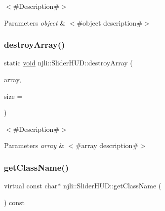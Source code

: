 $<$\#\+Description\#$>$


\begin{DoxyParams}{Parameters}
{\em object} & $<$\#object description\#$>$ \\
\hline
\end{DoxyParams}
\mbox{\label{classnjli_1_1_slider_h_u_d_ad2a2ea86c9748a6dbbaa9fb32860be0a}} 
\subsubsection{\texorpdfstring{destroy\+Array()}{destroyArray()}}
{\footnotesize\ttfamily static \mbox{\hyperlink{_thread_8h_af1e856da2e658414cb2456cb6f7ebc66}{void}} njli\+::\+Slider\+H\+U\+D\+::destroy\+Array (\begin{DoxyParamCaption}\item[{\mbox{\hyperlink{classnjli_1_1_slider_h_u_d}{Slider\+H\+UD}} $\ast$$\ast$}]{array,  }\item[{const \mbox{\hyperlink{_util_8h_a10e94b422ef0c20dcdec20d31a1f5049}{u32}}}]{size = {} }\end{DoxyParamCaption})\hspace{0.3cm}{\ttfamily [static]}}

$<$\#\+Description\#$>$


\begin{DoxyParams}{Parameters}
{\em array} & $<$\#array description\#$>$ \\
\hline
\end{DoxyParams}
\mbox{\label{classnjli_1_1_slider_h_u_d_a3a5f2b2fcb08174a629f52986153a67e}} 
\subsubsection{\texorpdfstring{get\+Class\+Name()}{getClassName()}}
{\footnotesize\ttfamily virtual const char$\ast$ njli\+::\+Slider\+H\+U\+D\+::get\+Class\+Name (\begin{DoxyParamCaption}{ }\end{DoxyParamCaption}) const\hspace{0.3cm}{\ttfamily [virtual]}}

